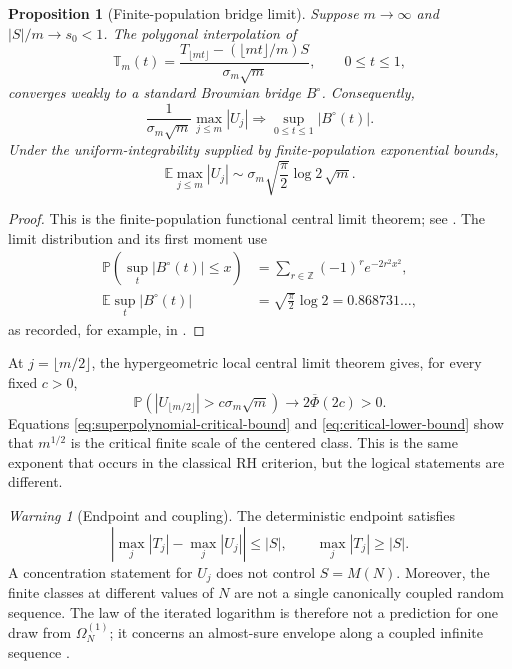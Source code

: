 \documentclass[11pt,reqno]{amsart}
\numberwithin{equation}{section}
\theoremstyle{plain}
\newtheorem{proposition}[theorem]{Proposition}
\theoremstyle{definition}
\theoremstyle{remark}
\newtheorem{warning}[theorem]{Warning}
\newcommand{\E}{\mathbb E}
\newcommand{\Prob}{\mathbb P}
\newcommand{\Om}{\Omega}
\begin{document}
\begin{proposition}[Finite-population bridge limit]
\label{prop:finite-population-fclt}
Suppose \(m\to\infty\) and \(|S|/m\to s_0<1\).  The polygonal interpolation
of
\begin{equation}
\mathbb T_m(t)=\frac{T_{\lfloor mt\rfloor}
-(\lfloor mt\rfloor/m)S}{\sigma_m\sqrt m},
\qquad 0\leq t\leq1,
\label{eq:bridge-process-normalization}
\end{equation}
converges weakly to a standard Brownian bridge \(B^{\circ}\).  Consequently,
\begin{equation}
\frac{1}{\sigma_m\sqrt m}\max_{j\leq m}|U_j|
\Longrightarrow\sup_{0\leq t\leq1}|B^{\circ}(t)|.
\label{eq:maximum-bridge-limit}
\end{equation}
Under the uniform-integrability supplied by finite-population exponential
bounds,
\begin{equation}
\E\max_{j\leq m}|U_j|
\sim\sigma_m\sqrt{\frac{\pi}{2}}\log2\,\sqrt m.
\label{eq:expected-bridge-maximum}
\end{equation}
\end{proposition}

\begin{proof}
This is the finite-population functional central limit theorem; see
\cite{Sen1972}.  The limit distribution and its first moment use
\begin{align}
\Prob\left(\sup_t|B^{\circ}(t)|\leq x\right)
&=\sum_{r\in\mathbb Z}(-1)^r e^{-2r^2x^2},
\label{eq:kolmogorov-distribution}\\
\E\sup_t|B^{\circ}(t)|
&=\sqrt{\frac{\pi}{2}}\log2
=0.868731\ldots,
\label{eq:kolmogorov-mean}
\end{align}
as recorded, for example, in \cite{Feller1968}.
\end{proof}

At \(j=\lfloor m/2\rfloor\), the hypergeometric local central limit theorem
gives, for every fixed \(c>0\),
\begin{equation}
\Prob\left(|U_{\lfloor m/2\rfloor}|>c\sigma_m\sqrt m\right)
\longrightarrow2\overline\Phi(2c)>0.
\label{eq:critical-lower-bound}
\end{equation}
Equations \eqref{eq:superpolynomial-critical-bound} and
\eqref{eq:critical-lower-bound} show that \(m^{1/2}\) is the critical finite
scale of the centered class.  This is the same exponent that occurs in the
classical RH criterion, but the logical statements are different.

\begin{warning}[Endpoint and coupling]
\label{warn:endpoint-and-coupling}
The deterministic endpoint satisfies
\begin{equation}
\left|\max_j|T_j|-\max_j|U_j|\right|\leq|S|,
\qquad \max_j|T_j|\geq|S|.
\label{eq:endpoint-obstruction}
\end{equation}
A concentration statement for \(U_j\) does not control \(S=M(N)\).
Moreover, the finite classes at different values of \(N\) are not a single
canonically coupled random sequence.  The law of the iterated logarithm is
therefore not a prediction for one draw from \(\Om_N^{(1)}\); it concerns an
almost-sure envelope along a coupled infinite sequence
\cite{HartmanWintner1941}.
\end{warning}
\end{document}
